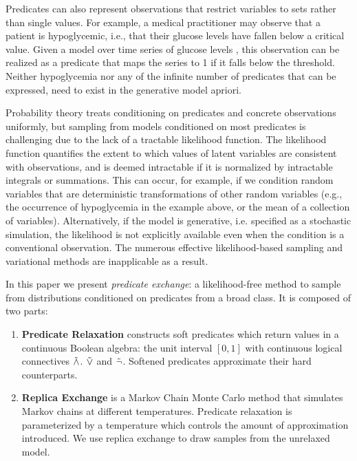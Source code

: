 Predicates can also represent observations that restrict variables to sets rather than single values.
For example, a medical practitioner may observe that a patient is hypoglycemic, i.e., that their glucose levels have fallen below a critical value.
Given a model over time series of glucose levels \citep{levine2017offline,murata2004probabilistic}, this observation can be realized as a predicate that maps the series to 1 if it falls below the threshold.
Neither hypoglycemia nor any of the infinite number of predicates that can be expressed, need to exist in the generative model apriori.

Probability theory treats conditioning on predicates and concrete observations uniformly, but sampling from models conditioned on most predicates is challenging due to the lack of a tractable likelihood function.
The likelihood function quantifies the extent to which values of latent variables are consistent with observations, and is deemed intractable if it is normalized by intractable integrals or summations.
This can occur, for example, if we condition random variables that are deterministic transformations of other random variables (e.g., the occurrence of hypoglycemia in the example above, or the mean of a collection of variables).	
Alternatively, if the model is generative, i.e. specified as a stochastic simulation, the likelihood is not explicitly available even when the condition is a conventional observation.
The numerous effective likelihood-based sampling \citep{andrieu2003introduction} and variational  \citep{jordan1999introduction, ranganath2014black} methods are inapplicable as a result.


In this paper we present \emph{predicate exchange}:
a likelihood-free method to sample from distributions conditioned on predicates from a broad class.
It is composed of two parts:
\begin{enumerate}
\item \textbf{Predicate Relaxation} constructs soft predicates which return values in a continuous Boolean algebra: the unit interval $[0, 1]$ with continuous logical connectives $\mathrel{\tilde{\land}}$. $\mathrel{\tilde{\lor}}$ and $\mathrel{\tilde{\neg}}$.  Softened predicates approximate their hard counterparts.
\item  \textbf{Replica Exchange} is a Markov Chain Monte Carlo method that simulates Markov chains at different temperatures.  Predicate relaxation is parameterized by a temperature which controls the amount of approximation introduced.  We use replica exchange to draw samples from the unrelaxed model. 
\end{enumerate}

